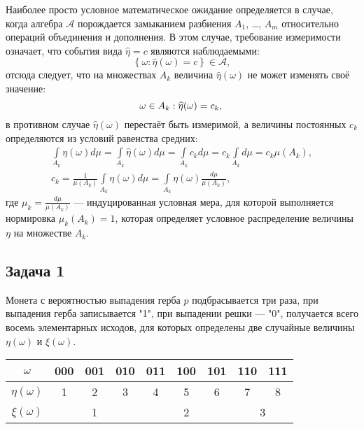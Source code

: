 \documentclass[a4paper,12pt]{article}
\newcommand{\set}[1]{\left \{ #1 \right \}}
\begin{document}
Наиболее просто условное математическое ожидание определяется в случае, когда алгебра $\mathcal{A}$ порождается замыканием
разбиения $A_1$, \dots, $A_m$ относительно операций объединения и дополнения. В этом случае, требование измеримости означает,
что события вида $\widehat{\eta} = c$ являются наблюдаемыми:
\[
    \set{\omega: \widehat{\eta}(\omega) = c} \in \mathcal{A} ,
\]
отсюда следует, что на множествах $A_k$ величина $\widehat{\eta}(\omega)$ не может изменять своё значение:
\[
    \omega \in A_k : \widehat{\eta}(\omega) = c_k , \\
\]
в противном случае $\widehat{\eta}(\omega)$ перестаёт быть измеримой, а величины постоянных $c_k$ определяются из условий равенства средних:
\begin{gather*}
    \int \limits_{A_k} \eta(\omega) d \mu
    = \int \limits_{A_k} \widehat{\eta}(\omega) d \mu
    = \int \limits_{A_k} c_k d \mu
    = c_k \int \limits_{A_k} d \mu
    = c_k \mu(A_k) , \\
    c_k
    = \frac{1}{\mu(A_k)} \int \limits_{A_k} \eta(\omega) d \mu
    = \int \limits_{A_k} \eta(\omega) \frac{d \mu}{\mu(A_k)} ,
\end{gather*}
где $\mu_k = \frac{d \mu}{\mu(A_k)}$ --- индуцированная условная мера, для которой выполняется нормировка $\mu_k(A_k) = 1$,
которая определяет условное распределение величины $\eta$ на множестве $A_k$.


\subsection*{Задача 1}

Монета с вероятностью выпадения герба $p$ подбрасывается три раза, при выпадения герба записывается "1"{}, при выпадении решки --- "0"{}, получается всего
восемь элементарных исходов, для которых определены две случайные величины $\eta(\omega)$ и $\xi(\omega)$.

\begin{center}
    \begin{tabular}{|c|c|c|c|c|c|c|c|c|}
        \hline
        $\omega$       & 000                     & 001                     & 010                     & 011 & 100 & 101 & 110 & 111 \\
        \hline
        $\eta(\omega)$ & 1                       & 2                       & 3                       & 4   & 5   & 6   & 7   & 8   \\
        \hline
        $\xi(\omega)$  & \multicolumn{3}{|c|}{1} & \multicolumn{3}{|c|}{2} & \multicolumn{2}{|c|}{3}                               \\
        \hline
    \end{tabular}
\end{center}
\end{document}
